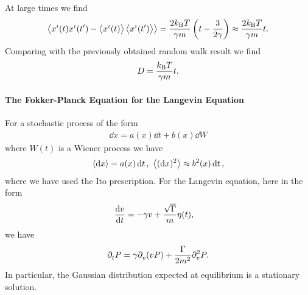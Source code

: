 At large times we find
\begin{align*}
	\expval{x^{i}(t)x^{i}(t\ensuremath{^{\prime}}) - \expval{x^{i}(t)}\expval{x^{i}(t\ensuremath{^{\prime}})}} = \frac{2k_{\text{B}} T}{\gamma m}\left(t - \frac{3}{2\gamma}\right) \approx \frac{2k_{\text{B}} T}{\gamma m}t.
\end{align*}
Comparing with the previously obtained random walk result we find
\begin{align*}
	D = \frac{k_{\text{B}} T}{\gamma m}t.
\end{align*}

\paragraph{The Fokker-Planck Equation for the Langevin Equation}
For a stochastic process of the form
\begin{align*}
	\dd{x} = a(x)\dd{t} + b(x)\dd{W}
\end{align*}
where $W(t)$ is a Wiener process we have
\begin{align*}
	\expval{\dd{x}} = a(x)\dd{t},\ \expval{(\dd{x})^{2}} \approx b^{2}(x)\dd{t},
\end{align*}
where we have used the Ito prescription. For the Langevin equation, here in the form
\begin{align*}
	\dv{v}{t} &= -\gamma v + \frac{\sqrt{\Gamma}}{m}\eta(t),
\end{align*}
we have
\begin{align*}
	\partial^{}_{t}{P} = \gamma\partial^{}_{v}{(vP)} + \frac{\Gamma}{2m^{2}}\partial^{2}_{v}{P}.
\end{align*}
In particular, the Gaussian distribution expected at equilibrium is a stationary solution.

